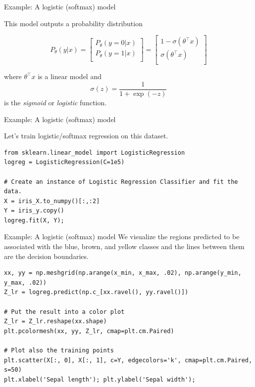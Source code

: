 \documentclass[../../main.tex]{subfiles}
\begin{document}
\begin{frame}[fragile]{Example: A logistic (softmax) model}

This model outputs a probability distribution 

$$
P_\theta(y| x) 
= \left[ \begin{array}{c}
P_\theta(y=0| x) \\
P_\theta(y=1| x) \\
\end{array} \right]
= \left[ \begin{array}{c}
1-\sigma(\theta^\top x) \\
\sigma(\theta^\top x) \\
\end{array} \right]
$$

where $\theta^\top x$ is a linear model and
$$\sigma(z) = \frac{1}{1 + \exp(-z)}$$
is the \textit{sigmoid} or \textit{logistic} function.

\end{frame}

\begin{frame}[fragile]{Example: A logistic (softmax) model}

Let's train logistic/softmax regression on this dataset.


\begin{lstlisting}
from sklearn.linear_model import LogisticRegression
logreg = LogisticRegression(C=1e5)

# Create an instance of Logistic Regression Classifier and fit the data.
X = iris_X.to_numpy()[:,:2]
Y = iris_y.copy()
logreg.fit(X, Y);
\end{lstlisting}

\end{frame}

\begin{frame}[fragile]{Example: A logistic (softmax) model}
We visualize the regions predicted to be associated with the blue, brown, and yellow classes and the lines between them are the decision boundaries.

\begin{lstlisting}
xx, yy = np.meshgrid(np.arange(x_min, x_max, .02), np.arange(y_min, y_max, .02))
Z_lr = logreg.predict(np.c_[xx.ravel(), yy.ravel()])

# Put the result into a color plot
Z_lr = Z_lr.reshape(xx.shape)
plt.pcolormesh(xx, yy, Z_lr, cmap=plt.cm.Paired)

# Plot also the training points
plt.scatter(X[:, 0], X[:, 1], c=Y, edgecolors='k', cmap=plt.cm.Paired, s=50)
plt.xlabel('Sepal length'); plt.ylabel('Sepal width');

\end{lstlisting}
\end{frame}
\end{document}
